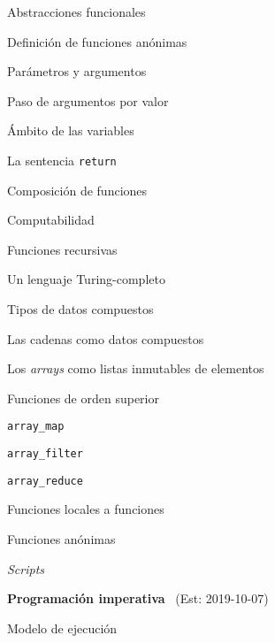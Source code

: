 \begin{longenum}
    \begin{longenum}
        \item Abstracciones funcionales
        \begin{longenum}
            \item Definición de funciones anónimas
            \item Parámetros y argumentos
            \item Paso de argumentos por valor
            \item Ámbito de las variables
            \item La sentencia \texttt{return}
        \end{longenum}
        \item Composición de funciones
        \item Computabilidad
        \begin{longenum}
            \item Funciones recursivas
            \item Un lenguaje Turing-completo
        \end{longenum}
        \item Tipos de datos compuestos
        \begin{longenum}
            \item Las cadenas como datos compuestos
            \item Los \textit{arrays} como listas inmutables de elementos
        \end{longenum}
        \item Funciones de orden superior
        \begin{longenum}
            \item \texttt{array\_map}
            \item \texttt{array\_filter}
            \item \texttt{array\_reduce}
            \item Funciones locales a funciones
            \item Funciones anónimas
        \end{longenum}
        \item \textit{Scripts}
    \end{longenum}
    \item \textbf{Programación imperativa} \ (Est: 2019-10-07)
    \begin{longenum}
        \item Modelo de ejecución
        \begin{longenum}

\end{longenum}
\end{longenum}
\end{longenum}

